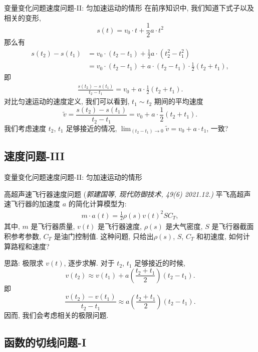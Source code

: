 \documentclass[
10pt,
aspectratio=43,
]{beamer}
\begin{document}
\begin{frame}{变量变化问题}{速度问题-II: 匀加速运动的情形}
	在前序知识中, 我们知道下式子以及相关的变形,
	\[
		s(t) = v_0\cdot t+ \frac{1}{2}a\cdot t^2
	\]
	那么有
	\begin{align*}
		s(t_2) - s(t_1) & = v_0\cdot (t_2-t_1)+ \frac{1}{2}a\cdot (t_2^2-t_1^2)            \\
		                & =v_0\cdot(t_2-t_1) + a\cdot(t_2-t_1) \cdot \frac{1}{2}(t_2+t_1), 
	\end{align*}
	即
	\begin{align*}
		\frac{s(t_2) - s(t_1)}{t_2-t_1} = v_0 + a\cdot \frac{1}{2}(t_2+t_1). 
	\end{align*}
	对比匀速运动的速度定义, 我们可以看到, $t_1\sim t_2$ 期间的平均速度
	\begin{equation*}
		\tilde{v}=\frac{s(t_2) - s(t_1)}{t_2-t_1} = v_0 + a\cdot \frac{1}{2}(t_2+t_1).
	\end{equation*}
	我们考虑速度 $t_2$, $t_1$ 足够接近的情况, $\lim_{(t_2-t_1)\to 0}\tilde{v}=v_0+a\cdot t_1$, 一致?
\end{frame}

\subsection{速度问题-III} %
\begin{frame}{变量变化问题}{速度问题-II: 匀加速运动的情形}
	\begin{exampleblock}{高超声速飞行器速度问题 \color{blue}(\small{\it 郭建国等, {现代防御技术}, 49(6) 2021.12.)}}
		平飞高超声速飞行器的加速度 $a$ 的简化计算模型为: 
		\begin{align*}
			m\cdot a(t)= \frac{1}{2}\rho(s) v(t)^2 S C_T, 
		\end{align*}
		其中, $m$ 是飞行器质量, $v(t)$ 是飞行器速度, $\rho(s)$ 是大气密度, $S$ 是飞行器截面积参考参数, $C_T$ 是油门控制值. 这种问题, 只给出$\rho(s)$, $S$, $C_T$ 和初速度, 如何计算路程和速度?	
	\end{exampleblock}
	思路: 极限求 $v(t)$, 逐步求解. 对于 $t_2$, $t_1$ 足够接近的时候,
	\[
		v(t_2)\approx v(t_1)+a\left(\frac{t_2+t_1}{2}\right)(t_2-t_1).
	\]
	即
	\[
		\frac{v(t_2)-v(t_1)}{t_2-t_1}\approx a\left(\frac{t_2+t_1}{2}\right)(t_2-t_1).
	\]
	因而, 我们会考虑相关的极限问题.
\end{frame}


\subsection{函数的切线问题-I} %
\end{document}
